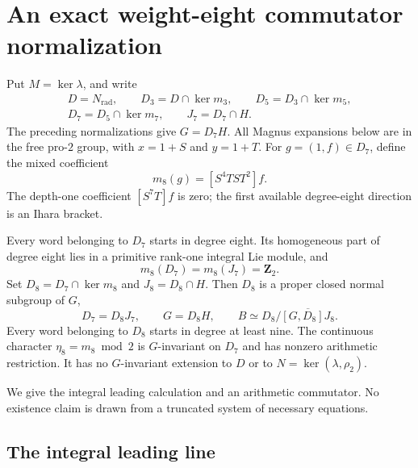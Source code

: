 \section{An exact weight-eight commutator normalization}
\label{sec:weight-eight-normalization}

Put $M=\ker\lambda$, and write
\[
 \begin{gathered}
 D=N_{\mathrm{rad}},\qquad D_3=D\cap\ker m_3,
 \qquad D_5=D_3\cap\ker m_5,\\
 D_7=D_5\cap\ker m_7,\qquad J_7=D_7\cap H.
\end{gathered}
\]
The preceding normalizations give $G=D_7H$. All Magnus expansions
below are in the free pro-$2$ group, with $x=1+S$ and $y=1+T$.
For $g=(1,f)\in D_7$, define the mixed coefficient
\[
 m_8(g)=[S^4TST^2]f.
\]
The depth-one coefficient $[S^7T]f$ is zero; the first available
degree-eight direction is an Ihara bracket.

\begin{theorem}\label{thm:weight-eight-exact-image}
Every word belonging to $D_7$ starts in degree eight. Its homogeneous
part of degree eight lies in a primitive rank-one integral Lie module,
and
\[
 m_8(D_7)=m_8(J_7)=\mathbf Z_2.
\]
Set $D_8=D_7\cap\ker m_8$ and $J_8=D_8\cap H$. Then $D_8$ is a
proper closed normal subgroup of $G$,
\[
 D_7=D_8J_7,\qquad G=D_8H,\qquad
 B\simeq D_8/\overline{[G,D_8]J_8}.
\]
Every word belonging to $D_8$ starts in degree at least nine.
The continuous character $\eta_8=m_8\bmod2$ is $G$-invariant on
$D_7$ and has nonzero arithmetic restriction. It has no
$G$-invariant extension to $D$ or to $N=\ker(\lambda,\rho_2)$.
\end{theorem}

We give the integral leading calculation and an arithmetic
commutator. No existence claim is drawn from a truncated system of
necessary equations.

\subsection{The integral leading line}

